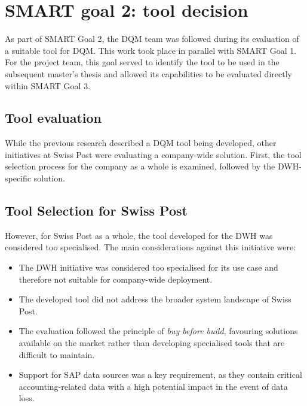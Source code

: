 \section{SMART goal 2: tool decision}

As part of SMART Goal 2, the DQM team was followed during its evaluation of a suitable tool for \gls{DQM}. This work took place in parallel with SMART Goal 1. For the project team, this goal served to identify the tool to be used in the subsequent master's thesis and allowed its capabilities to be evaluated directly within SMART Goal 3.



\subsection*{Tool evaluation}

While the previous research \cite{Roccaro2026_Project1} described a \gls{DQM} tool being developed, other initiatives at Swiss Post were evaluating a company-wide solution. First, the tool selection process for the company as a whole is examined, followed by the \gls{DWH}-specific solution.



\subsection*{Tool Selection for Swiss Post}

However, for Swiss Post as a whole, the tool developed for the DWH was considered too specialised. The main considerations against this initiative were:

\begin{itemize}
    \item The DWH initiative was considered too specialised for its use case and therefore not suitable for company-wide deployment.
    \item The developed tool did not address the broader system landscape of Swiss Post.
    \item The evaluation followed the principle of \textit{buy before build}, favouring solutions available on the market rather than developing specialised tools that are difficult to maintain.
    \item Support for SAP data sources was a key requirement, as they contain critical accounting-related data with a high potential impact in the event of data loss.
\end{itemize}


